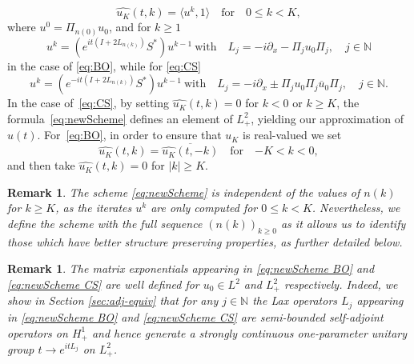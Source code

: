 \documentclass [11pt] {article}
\newtheorem{rem}[thm]{Remark}
\newcommand{\<}{\langle}
\renewcommand{\>}{\rangle}
\newcommand{\ol}[1]{\overline{#1}}
\begin{document}
\begin{equation}\label{eq:newScheme}
\widehat{u_{K}}(t,k) = \langle u^k, 1\rangle \quad\text{for}\quad 0\le k < K ,
\end{equation}
where
$u^0 = \Pi_{n(0)} u_0$, and for $k \ge 1$
\begin{equation}\label{eq:newScheme BO}
u^{k} = \left(e^{it(I + 2 L_{n(k)})}S^{*}\right)u^{k-1} \ \text{with}  \quad L_{j} = -i\partial_x - \Pi_{j}u_0\Pi_{j}, \quad j\in\mathbb{N}
\end{equation}
in the case of \eqref{eq:BO}, while for \eqref{eq:CS} 
\begin{equation}\label{eq:newScheme CS}
u^{k}  = \left(e^{-it(I + 2L_{n(k)})}S^{*}\right)u^{k-1}\  \text{with} \quad L_{j} = -i\partial_x \pm \Pi_{j}u_0\Pi_{j}\ol u_0 \Pi_{j}, \quad j\in\mathbb{N}.
\end{equation}
In the case of~\eqref{eq:CS}, by setting $\widehat{u_K}(t,k) = 0$ for $k<0$ or $k \ge K$, the formula~\eqref{eq:newScheme} defines an element of $L^2_+$, yielding our approximation of $u(t)$.  For~\eqref{eq:BO}, in order to ensure that $u_K$ is real-valued we set
\begin{equation*}
\widehat{u_{K}}(t,k) = \overline{\widehat{u_K}(t,-k)} \quad\text{for}\quad {-K} < k <0, 
\end{equation*}
and then take $\widehat{u_K}(t,k) = 0$ for $|k|\ge K$. 
%
%
\begin{rem}
The scheme \eqref{eq:newScheme} is independent of the values of $n(k)$ for $k \ge K$, as the iterates $u^k$ are only computed for $0\le k <K$. Nevertheless, we define the scheme with the full sequence $(n(k))_{k\ge 0}$ as it allows us to identify those which have better structure preserving properties, as further detailed below.
\end{rem}
\begin{rem}
The matrix exponentials appearing in \eqref{eq:newScheme BO} and \eqref{eq:newScheme CS} are well defined for $u_0\in L^{2}$ and $L^2_{+}$ respectively. Indeed, we show in Section \ref{sec:adj-equiv} that for any $j \in \mathbb{N}$ the Lax operators $L_j$ appearing in \eqref{eq:newScheme BO} and \eqref{eq:newScheme CS} are semi-bounded self-adjoint operators on $H^1_{+}$ and hence generate a strongly continuous one-parameter unitary group $t \to e^{itL_{j}}$ on $L^2_{+}$.
\end{rem}
\end{document}
